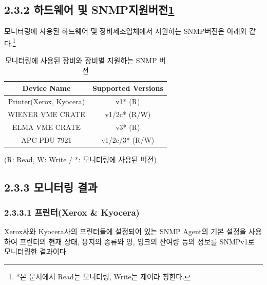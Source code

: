 \documentclass[11pt
  , a4paper
  , article
  , oneside
]{memoir}
\begin{document}
\subsection{2.3.2 하드웨어 및 SNMP지원버전\ref{table:used_version}}
모니터링에 사용된 하드웨어 및 장비제조업체에서 지원하는 SNMP버전은 아래와 같다.\footnote{*본 문서에서 Read는 모니터링, Write는 제어라 칭한다.}
\begin{table}[h]
\begin{center}
\begin{tabular}{c|c}\hline
Device Name & Supported Versions \\ \hline
Printer(Xerox, Kyocera) & v1* (R) \\ \hline
WIENER VME CRATE & v1/2c* (R/W) \\ \hline
ELMA VME CRATE & v3* (R) \\ \hline
APC PDU 7921 & v1/2c/3* (R/W) \\ \hline
\end{tabular}
\caption{모니터링에 사용된 장비와 장비별 지원하는 SNMP 버전}
{(R: Read, W: Write / *: 모니터링에 사용된 버전)}
  \label{table:used_version}  
\end{center}
\end{table} 

\clearpage
\subsection{2.3.3 모니터링 결과}
\subsubsection{2.3.3.1 프린터(Xerox \& Kyocera)}

Xerox사와 Kyocera사의 프린터들에 설정되어 있는 SNMP Agent의 기본 설정을 사용하여 프린터의 현재 상태, 용지의 종류와 양, 잉크의 잔여량 등의 정보를 SNMPv1로 모니터링한 결과이다. 
\end{document}
